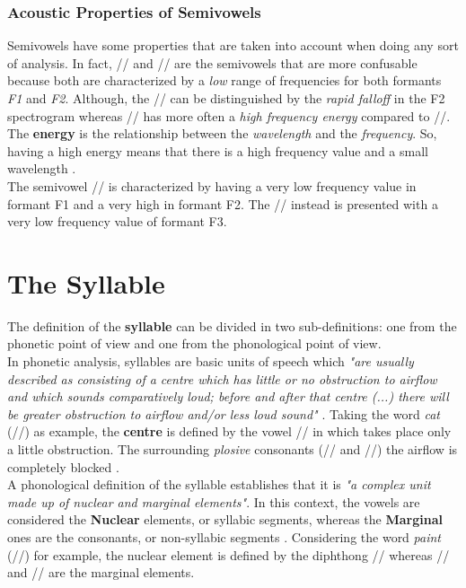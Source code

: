 
\subsubsection{Acoustic Properties of Semivowels}
\label{ssub:Acousitc Properties of Semivowels}
Semivowels have some properties that are taken into account when doing any sort of analysis. In fact, // and // are the semivowels that are more confusable because both are characterized by a \textit{low} range of frequencies for both formants \textit{F1} and \textit{F2}. Although, the // can be distinguished by the \textit{rapid falloff} in the F2 spectrogram whereas // has more often a \textit{high frequency energy} compared to //. The \textbf{energy} is the relationship between the \textit{wavelength} and the \textit{frequency}. So, having a high energy means that there is a high frequency value and a small wavelength \cite{energy_relationship}. \\
\noindent The semivowel // is characterized by having a very low frequency value in formant F1 and a very high in formant F2. The // instead is presented with a very low frequency value of formant F3.


\section{The Syllable}
\label{sec:The syllable}
The definition of the \textbf{syllable} can be divided in two sub-definitions: one from the phonetic point of view and one from the phonological point of view. \\
\noindent In phonetic analysis, syllables are basic units of speech  which \textit{"are usually described as consisting of a centre which has little or no obstruction to airflow and which sounds comparatively loud; before and after that centre (...) there will be greater obstruction to airflow and/or less loud sound"} \cite{roach2000phonology}. Taking the word \textit{cat} (//) as example, the \textbf{centre} is defined by the vowel /\textipa{\ae}/ in which takes place only a little obstruction. The surrounding \textit{plosive} consonants (// and //) the airflow is completely blocked \cite{syllable_site}. \\
\noindent A phonological definition of the syllable establishes that it is \textit{"a complex unit made up of nuclear and marginal elements"}\cite{laver1994principles}. In this context, the vowels are considered the \textbf{Nuclear} elements, or syllabic segments, whereas the \textbf{Marginal} ones are the consonants, or non-syllabic segments \cite{syllable_site}. Considering the word \textit{paint} (//) for example, the nuclear element is defined by the diphthong // whereas // and // are the marginal elements.

